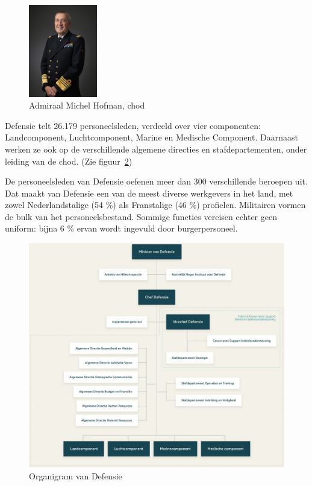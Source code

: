 \begin{figure}
    \includegraphics[width=3cm]{img/michel_hofman.jpg}
    \caption{\label{fig:chod}Admiraal Michel Hofman, \gls{chod}~\autocite{Nato2020}}
\end{figure}

Defensie telt 26.179 personeelsleden, verdeeld over vier componenten: Landcomponent, Luchtcomponent, Marine en Medische Component. Daarnaast werken ze ook op de verschillende algemene directies en stafdepartementen, onder leiding van de \gls{chod}. (Zie figuur~\ref{fig:organigram-defensie})

De personeelsleden van Defensie oefenen meer dan 300 verschillende beroepen uit. Dat maakt van Defensie een van de meest diverse werkgevers in het land, met zowel Nederlandstalige (54 \%) als Franstalige (46 \%) profielen. Militairen vormen de bulk van het personeelsbestand. Sommige functies vereisen echter geen uniform: bijna 6 \% ervan wordt ingevuld door burgerpersoneel. \autocite{Defensie2022}

\begin{figure}
    \includegraphics[width=\textwidth]{img/organigram-defensie.png}
    \caption{\label{fig:organigram-defensie}Organigram van Defensie~\autocite{Defensie2022}}
\end{figure}

